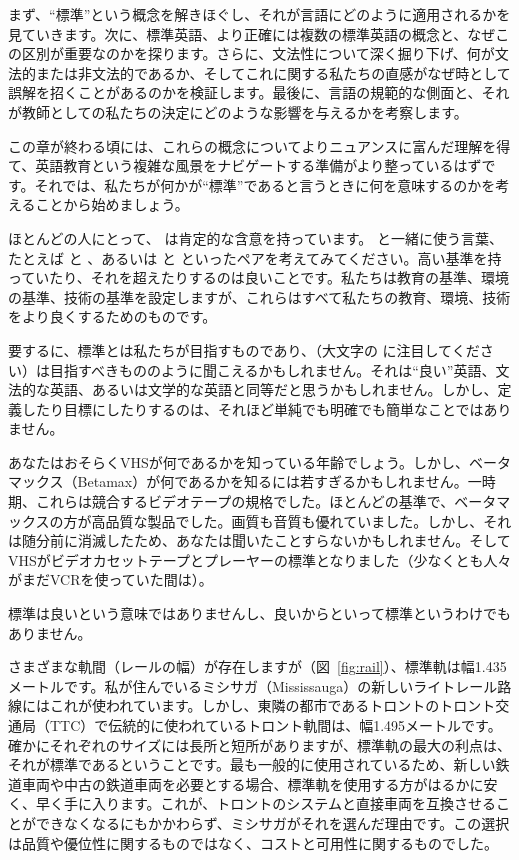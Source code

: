 まず、\enquote{標準}という概念を解きほぐし、それが言語にどのように適用されるかを見ていきます。次に、標準英語、より正確には複数の標準英語の概念と、なぜこの区別が重要なのかを探ります。さらに、文法性について深く掘り下げ、何が文法的または非文法的であるか、そしてこれに関する私たちの直感がなぜ時として誤解を招くことがあるのかを検証します。最後に、言語の規範的な側面と、それが教師としての私たちの決定にどのような影響を与えるかを考察します。

この章が終わる頃には、これらの概念についてよりニュアンスに富んだ理解を得て、英語教育という複雑な風景をナビゲートする準備がより整っているはずです。それでは、私たちが何かが\enquote{標準}であると言うときに何を意味するのかを考えることから始めましょう。

ほとんどの人にとって、 は肯定的な含意を持っています。 と一緒に使う言葉、たとえば  と 、あるいは  と  といったペアを考えてみてください。高い基準を持っていたり、それを超えたりするのは良いことです。私たちは教育の基準、環境の基準、技術の基準を設定しますが、これらはすべて私たちの教育、環境、技術をより良くするためのものです。

要するに、標準とは私たちが目指すものであり、（大文字の  に注目してください）は目指すべきもののように聞こえるかもしれません。それは\enquote{良い}英語、文法的な英語、あるいは文学的な英語と同等だと思うかもしれません。しかし、定義したり目標にしたりするのは、それほど単純でも明確でも簡単なことではありません。

あなたはおそらくVHSが何であるかを知っている年齢でしょう。しかし、ベータマックス（Betamax）が何であるかを知るには若すぎるかもしれません。一時期、これらは競合するビデオテープの規格でした。ほとんどの基準で、ベータマックスの方が高品質な製品でした。画質も音質も優れていました。しかし、それは随分前に消滅したため、あなたは聞いたことすらないかもしれません。そしてVHSがビデオカセットテープとプレーヤーの標準となりました（少なくとも人々がまだVCRを使っていた間は）。

標準は良いという意味ではありませんし、良いからといって標準というわけでもありません。

さまざまな軌間（レールの幅）が存在しますが（図~\ref{fig:rail}）、標準軌は幅1.435メートルです。私が住んでいるミシサガ（Mississauga）の新しいライトレール路線にはこれが使われています。しかし、東隣の都市であるトロントのトロント交通局（TTC）で伝統的に使われているトロント軌間は、幅1.495メートルです。確かにそれぞれのサイズには長所と短所がありますが、標準軌の最大の利点は、それが標準であるということです。最も一般的に使用されているため、新しい鉄道車両や中古の鉄道車両を必要とする場合、標準軌を使用する方がはるかに安く、早く手に入ります。これが、トロントのシステムと直接車両を互換させることができなくなるにもかかわらず、ミシサガがそれを選んだ理由です。この選択は品質や優位性に関するものではなく、コストと可用性に関するものでした。

